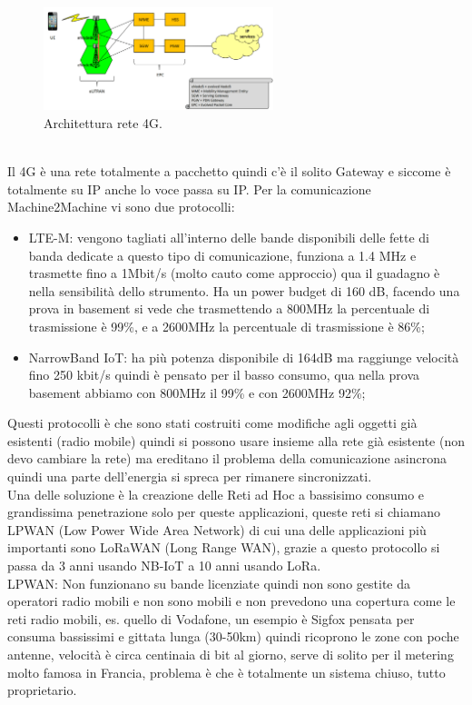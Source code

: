 \documentclass[11pt, twocolumn]{article}
\newenvironment{myitemize}
{ \begin{itemize}[topsep=0ex]
		\setlength{\itemsep}{0pt}
		\setlength{\parskip}{0pt}
		\setlength{\parsep}{0pt}     }
	{ \end{itemize}                  }
\begin{document}
\begin{figure}[!h]
  \centering
  \includegraphics[width=\linewidth,height=3cm]{imgs/4g.png}
  \caption{Architettura rete 4G.}
  \label{fig:4g}
\end{figure}\\
Il 4G è una rete totalmente a pacchetto quindi c'è il solito Gateway e siccome è totalmente su IP anche lo voce passa su IP.
Per la comunicazione Machine2Machine vi sono due protocolli:
\begin{myitemize}
  \item LTE-M: vengono tagliati all'interno delle bande disponibili delle fette di banda dedicate a questo tipo di comunicazione, funziona a 1.4 MHz e trasmette fino a 1Mbit/s (molto cauto come approccio) qua il guadagno è nella sensibilità dello strumento.
  Ha un power budget di 160 dB, facendo una prova in basement si vede che trasmettendo a 800MHz la percentuale di trasmissione è 99\%, e a 2600MHz la percentuale di trasmissione è 86\%;
  \item NarrowBand IoT: ha più potenza disponibile di 164dB ma raggiunge velocità fino 250 kbit/s quindi è pensato per il basso consumo, qua nella prova basement abbiamo con 800MHz il 99\% e con 2600MHz 92\%;
\end{myitemize}
Questi protocolli è che sono stati costruiti come modifiche agli oggetti già esistenti (radio mobile) quindi si possono usare insieme alla rete già esistente (non devo cambiare la rete) ma ereditano il problema della comunicazione asincrona quindi una parte dell'energia si spreca per rimanere sincronizzati.\\
Una delle soluzione è la creazione delle Reti ad Hoc a bassisimo consumo e grandissima penetrazione solo per queste applicazioni, queste reti si chiamano LPWAN (Low Power Wide Area Network) di cui una delle applicazioni più importanti sono LoRaWAN (Long Range WAN), grazie a questo protocollo si passa da 3 anni usando NB-IoT a 10 anni usando LoRa.\\
LPWAN: Non funzionano su bande licenziate quindi non sono gestite da operatori radio mobili e non sono mobili e non prevedono una copertura come le reti radio mobili, es. quello di Vodafone, un esempio è Sigfox pensata per consuma bassissimi e gittata lunga (30-50km) quindi ricoprono le zone con poche antenne, velocità è circa centinaia di bit al giorno, serve di solito per il metering molto famosa in Francia, problema è che è totalmente un sistema chiuso, tutto proprietario. 
\end{document}
